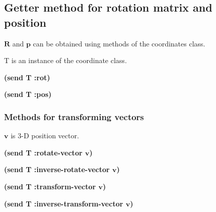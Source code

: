 \subsection*{Getter method for rotation matrix and position}

$\mathbf{R}$ and $\mathbf{p}$ can be obtained using methods of the coordinates class.

T is an instance of the coordinate class.

\begin{refdesc}

{\bf (send T :rot)}

{\bf (send T :pos)}

\end{refdesc}

\subsubsection*{Methods for transforming vectors}

$\mathbf{v}$ is 3-D position vector.

\begin{refdesc}

{\bf (send T :rotate-vector $\mathbf{v}$)}

{\bf (send T :inverse-rotate-vector $\mathbf{v}$)}

{\bf (send T :transform-vector $\mathbf{v}$)}

{\bf (send T :inverse-transform-vector $\mathbf{v}$)}

\end{refdesc}

